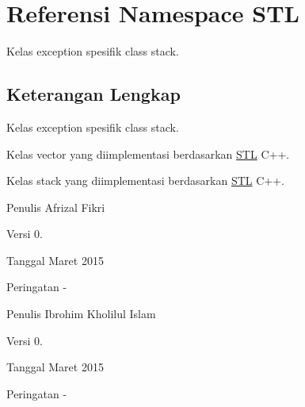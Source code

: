 \hypertarget{namespaceSTL}{}\section{Referensi Namespace S\+T\+L}
\label{namespaceSTL}


Kelas exception spesifik class stack.  




\subsection{Keterangan Lengkap}
Kelas exception spesifik class stack. 

Kelas vector yang diimplementasi berdasarkan \hyperlink{namespaceSTL}{S\+T\+L} C++.

Kelas stack yang diimplementasi berdasarkan \hyperlink{namespaceSTL}{S\+T\+L} C++.

\begin{DoxyAuthor}{Penulis}
Afrizal Fikri 
\end{DoxyAuthor}
\begin{DoxyVersion}{Versi}
0. 
\end{DoxyVersion}
\begin{DoxyDate}{Tanggal}
Maret 2015 
\end{DoxyDate}
\begin{DoxyWarning}{Peringatan}
-\/
\end{DoxyWarning}
\begin{DoxyAuthor}{Penulis}
Ibrohim Kholilul Islam 
\end{DoxyAuthor}
\begin{DoxyVersion}{Versi}
0. 
\end{DoxyVersion}
\begin{DoxyDate}{Tanggal}
Maret 2015 
\end{DoxyDate}
\begin{DoxyWarning}{Peringatan}
-\/ 
\end{DoxyWarning}
